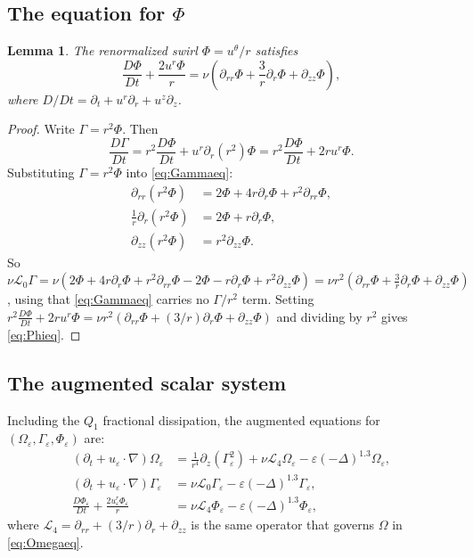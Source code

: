 \documentclass{article}
\newtheorem{lemma}[theorem]{Lemma}
\theoremstyle{definition}
\theoremstyle{remark}
\newcommand{\e}{\varepsilon}
\newcommand{\Lc}{\mathcal{L}}
\begin{document}
\subsection{The equation for \texorpdfstring{$\Phi$}{Phi}}\label{subsec:Phieq}

\begin{lemma}\label{lem:Phieq}
  The renormalized swirl $\Phi = u^\theta/r$ satisfies
  \begin{equation}\label{eq:Phieq}
    \frac{D\Phi}{Dt} + \frac{2u^r\Phi}{r}
    = \nu\!\left(\partial_{rr}\Phi + \frac{3}{r}\partial_r\Phi
      + \partial_{zz}\Phi\right),
  \end{equation}
  where $D/Dt = \partial_t + u^r\partial_r + u^z\partial_z$.
\end{lemma}
\begin{proof}
  Write $\Gamma = r^2\Phi$.  Then
  \[
    \frac{D\Gamma}{Dt}
    = r^2\frac{D\Phi}{Dt}
      + u^r\partial_r(r^2)\Phi
    = r^2\frac{D\Phi}{Dt} + 2r u^r\Phi.
  \]
  Substituting $\Gamma = r^2\Phi$ into \eqref{eq:Gammaeq}:
  \begin{align*}
    \partial_{rr}(r^2\Phi) &= 2\Phi + 4r\partial_r\Phi + r^2\partial_{rr}\Phi,\\
    \frac{1}{r}\partial_r(r^2\Phi) &= 2\Phi + r\partial_r\Phi,\\
    \partial_{zz}(r^2\Phi) &= r^2\partial_{zz}\Phi.
  \end{align*}
  So $\nu\Lc_0\Gamma = \nu(2\Phi + 4r\partial_r\Phi + r^2\partial_{rr}\Phi
  - 2\Phi - r\partial_r\Phi + r^2\partial_{zz}\Phi)
  = \nu r^2(\partial_{rr}\Phi + \frac{3}{r}\partial_r\Phi
  + \partial_{zz}\Phi)$, using that \eqref{eq:Gammaeq} carries no
  $\Gamma/r^2$ term.  Setting
  $r^2\frac{D\Phi}{Dt} + 2ru^r\Phi = \nu r^2(\partial_{rr}\Phi
  + (3/r)\partial_r\Phi + \partial_{zz}\Phi)$ and dividing by $r^2$
  gives \eqref{eq:Phieq}.
\end{proof}

\subsection{The augmented scalar system}

Including the $Q_1$ fractional dissipation, the augmented equations for
$(\Omega_\e, \Gamma_\e, \Phi_\e)$ are:
\begin{align}
  (\partial_t + u_\e\cdot\nabla)\Omega_\e
    &= \frac{1}{r^4}\partial_z(\Gamma_\e^2)
       + \nu\Lc_4\Omega_\e
       - \e(-\Delta)^{1.3}\Omega_\e,
       \label{eq:NSe-Omega}\\
  (\partial_t + u_\e\cdot\nabla)\Gamma_\e
    &= \nu\Lc_0\Gamma_\e - \e(-\Delta)^{1.3}\Gamma_\e,
       \label{eq:NSe-Gamma}\\
  \frac{D\Phi_\e}{Dt} + \frac{2u_\e^r\Phi_\e}{r}
    &= \nu\Lc_4\Phi_\e - \e(-\Delta)^{1.3}\Phi_\e,
       \label{eq:NSe-Phi}
\end{align}
where $\Lc_4 = \partial_{rr} + (3/r)\partial_r + \partial_{zz}$ is the same
operator that governs $\Omega$ in \eqref{eq:Omegaeq}.
\end{document}
